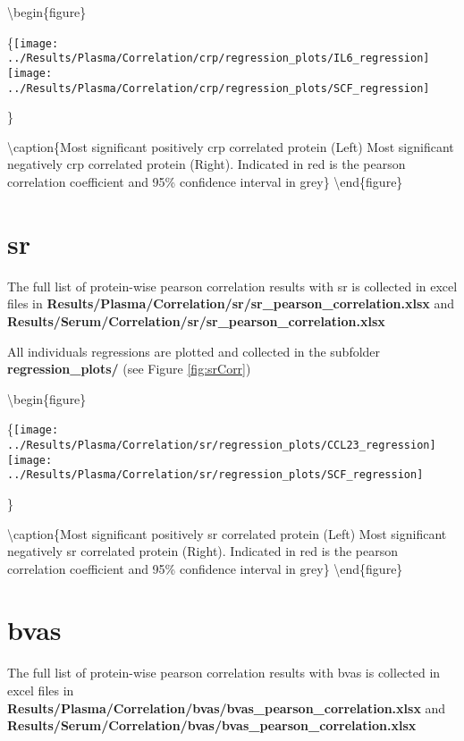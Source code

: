 \documentclass[
]{book}
\begin{document}
\textbackslash begin\{figure\}

\{\centering \texttt{[image: ../Results/Plasma/Correlation/crp/regression\_plots/IL6\_regression]} \texttt{[image: ../Results/Plasma/Correlation/crp/regression\_plots/SCF\_regression]}

\}

\textbackslash caption\{Most significant positively crp correlated protein (Left) Most significant negatively crp correlated protein (Right). Indicated in red is the pearson correlation coefficient and 95\% confidence interval in grey\}\label{fig:crpCorr}
\textbackslash end\{figure\}

\hypertarget{sr}{%
\section{sr}\label{sr}}

The full list of protein-wise pearson correlation results with sr is collected in excel files in \textbf{Results/Plasma/Correlation/sr/sr\_pearson\_correlation.xlsx} and \textbf{Results/Serum/Correlation/sr/sr\_pearson\_correlation.xlsx}

All individuals regressions are plotted and collected in the subfolder \textbf{regression\_plots/} (see Figure \ref{fig:srCorr})

\textbackslash begin\{figure\}

\{\centering \texttt{[image: ../Results/Plasma/Correlation/sr/regression\_plots/CCL23\_regression]} \texttt{[image: ../Results/Plasma/Correlation/sr/regression\_plots/SCF\_regression]}

\}

\textbackslash caption\{Most significant positively sr correlated protein (Left) Most significant negatively sr correlated protein (Right). Indicated in red is the pearson correlation coefficient and 95\% confidence interval in grey\}\label{fig:srCorr}
\textbackslash end\{figure\}

\hypertarget{bvas}{%
\section{bvas}\label{bvas}}

The full list of protein-wise pearson correlation results with bvas is collected in excel files in \textbf{Results/Plasma/Correlation/bvas/bvas\_pearson\_correlation.xlsx} and \textbf{Results/Serum/Correlation/bvas/bvas\_pearson\_correlation.xlsx}
\end{document}
